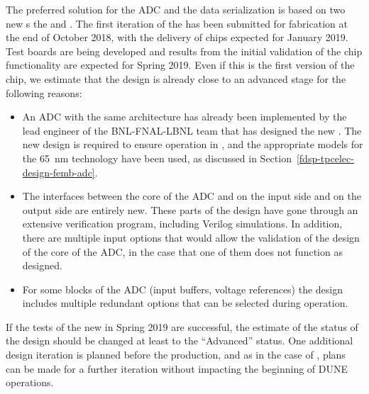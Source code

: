 The preferred solution for the ADC and the data serialization is based on two new 
s the  and .
The first iteration of the  has been submitted for fabrication
at the end of October 2018, with the delivery of chips expected for January 2019.
Test boards are being developed and results from the initial validation of the
chip functionality are expected for Spring 2019. Even if this is the first version
of the chip, we estimate that the design is already close to an advanced stage
for the following reasons:
\begin{itemize}
\item{An ADC with the same architecture has already been implemented by the
lead engineer of the BNL-FNAL-LBNL team that has designed the new .
The new design is required to ensure operation in \lar, and the appropriate
models for the \SI{65}{nm} technology have been used, as discussed in
Section~\ref{fdsp-tpcelec-design-femb-adc}.}
\item{The interfaces between the core of the ADC and  on 
the input side and  on the output side are entirely new.
These parts of the design have gone through an extensive verification
program, including Verilog simulations. In addition, there are multiple 
input options that would allow the validation of the design of the core 
of the ADC, in the case that one of them does not function as designed.}
\item{For some blocks of the ADC (input buffers, voltage references) the
design includes multiple redundant options that can be selected during 
operation.}
\end{itemize}
If the tests of the new  in Spring 2019 are successful, the
estimate of the status of the design should be changed at least to the 
``Advanced'' status. One additional design iteration is planned before
the production, and as in the case of , plans can be made for a
further iteration without impacting the beginning of DUNE operations.

